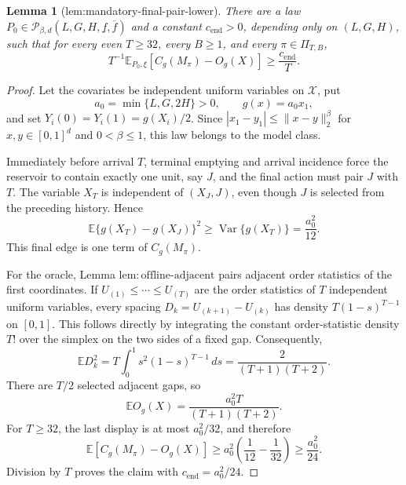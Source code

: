 \documentclass{article}
\newtheorem{lemma}{Lemma}
\begin{document}
\begin{lemma}[lem:mandatory-final-pair-lower]\label{lem:mandatory-final-pair-lower}
There are a law \(P_0\in\mathcal P_{\beta,d}(L,G,H,\underline f,\overline f)\) and a constant \(c_{\mathrm{end}}>0\), depending only on \((L,G,H)\), such that for every even \(T\ge32\), every \(B\ge1\), and every \(\pi\in\Pi_{T,B}\),
\[
T^{-1}\mathbb E_{P_0,\xi}[C_g(M_\pi)-O_g(X)]\ge \frac{c_{\mathrm{end}}}{T}.
\]
\end{lemma}
\begin{proof}
Let the covariates be independent uniform variables on \(\mathcal X\), put
\[
a_0=\min\{L,G,2H\}>0,\qquad g(x)=a_0x_1,
\]
and set \(Y_i(0)=Y_i(1)=g(X_i)/2\).  Since \(|x_1-y_1|\le\|x-y\|_2^\beta\) for \(x,y\in[0,1]^d\) and \(0<\beta\le1\), this law belongs to the model class.

Immediately before arrival \(T\), terminal emptying and arrival incidence force the reservoir to contain exactly one unit, say \(J\), and the final action must pair \(J\) with \(T\).  The variable \(X_T\) is independent of \((X_J,J)\), even though \(J\) is selected from the preceding history.  Hence
\[
\mathbb E\{g(X_T)-g(X_J)\}^2
\ge\operatorname{Var}\{g(X_T)\}=\frac{a_0^2}{12}.
\]
This final edge is one term of \(C_g(M_\pi)\).

For the oracle, Lemma \(\mathrm{lem:offline\text{-}adjacent}\) pairs adjacent order statistics of the first coordinates.  If \(U_{(1)}\le\cdots\le U_{(T)}\) are the order statistics of \(T\) independent uniform variables, every spacing \(D_k=U_{(k+1)}-U_{(k)}\) has density \(T(1-s)^{T-1}\) on \([0,1]\).  This follows directly by integrating the constant order-statistic density \(T!\) over the simplex on the two sides of a fixed gap.  Consequently,
\[
\mathbb E D_k^2=T\int_0^1s^2(1-s)^{T-1}\,ds=\frac{2}{(T+1)(T+2)}.
\]
There are \(T/2\) selected adjacent gaps, so
\[
\mathbb E O_g(X)=\frac{a_0^2T}{(T+1)(T+2)}.
\]
For \(T\ge32\), the last display is at most \(a_0^2/32\), and therefore
\[
\mathbb E[C_g(M_\pi)-O_g(X)]
\ge a_0^2\left(\frac1{12}-\frac1{32}\right)
\ge\frac{a_0^2}{24}.
\]
Division by \(T\) proves the claim with \(c_{\mathrm{end}}=a_0^2/24\).
\end{proof}
\end{document}
